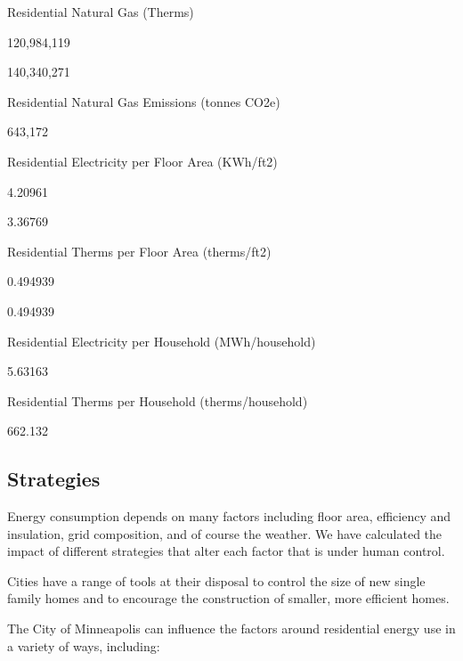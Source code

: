\documentclass[
]{book}
\begin{document}
Residential Natural Gas (Therms)

120,984,119

140,340,271

Residential Natural Gas Emissions (tonnes CO2e)

643,172

Residential Electricity per Floor Area (KWh/ft2)

4.20961

3.36769

Residential Therms per Floor Area (therms/ft2)

0.494939

0.494939

Residential Electricity per Household (MWh/household)

5.63163

Residential Therms per Household (therms/household)

662.132

\hypertarget{strategies}{%
\subsection{Strategies}\label{strategies}}

Energy consumption depends on many factors including floor area, efficiency and insulation, grid composition, and of course the weather. We have calculated the impact of different strategies that alter each factor that is under human control.

Cities have a range of tools at their disposal to control the size of new single family homes and to encourage the construction of smaller, more efficient homes.

The City of Minneapolis can influence the factors around residential energy use in a variety of ways, including:
\end{document}
